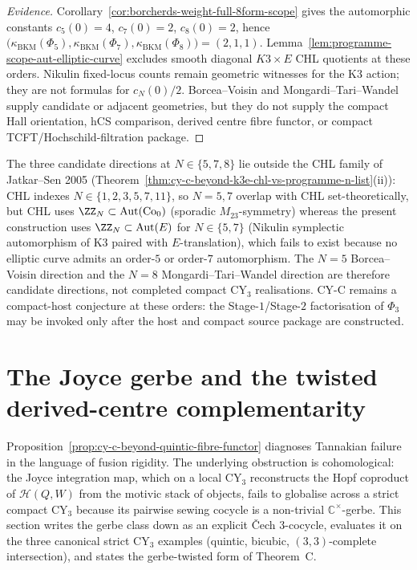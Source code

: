 \begin{proof}[Evidence]
Corollary~\ref{cor:borcherds-weight-full-8form-scope} gives the
automorphic constants \(c_5(0)=4\), \(c_7(0)=2\), \(c_8(0)=2\), hence
\(\bigl(\kappa_{\mathrm{BKM}}(\Phi_5),\kappa_{\mathrm{BKM}}(\Phi_7),\kappa_{\mathrm{BKM}}(\Phi_8)\bigr)=(2,1,1)\). Lemma~\ref{lem:programme-scope-aut-elliptic-curve}
excludes smooth diagonal \(K3\times E\) CHL quotients at these orders.
Nikulin fixed-locus counts remain geometric witnesses for the K3 action;
they are not formulas for \(c_N(0)/2\). Borcea--Voisin and
Mongardi--Tari--Wandel supply candidate or adjacent geometries, but they
do not supply the compact Hall orientation, hCS comparison, derived
centre fibre functor, or compact TCFT/Hochschild-filtration package.
\end{proof}

\begin{remark}
\label{rem:cy-c-beyond-non-chl-stratum-cy-c}
The three candidate directions at $N \in \{5, 7, 8\}$ lie outside the
CHL family of Jatkar--Sen 2005
(Theorem~\ref{thm:cy-c-beyond-k3e-chl-vs-programme-n-list}(ii)):
CHL indexes $N \in \{1, 2, 3, 5, 7, 11\}$, so $N = 5, 7$ overlap
with CHL set-theoretically, but CHL uses
$\ZZ_N \subset \mathrm{Aut}(\mathrm{Co}_0)$ (sporadic $M_{23}$-symmetry)
whereas the present construction uses
$\ZZ_N \subset \mathrm{Aut}(E)$ for $N \in \{5, 7\}$ (Nikulin
symplectic automorphism of K3 paired with $E$-translation), which
fails to exist because no elliptic curve admits an order-$5$ or
order-$7$ automorphism. The $N = 5$ Borcea--Voisin direction and the
$N = 8$ Mongardi--Tari--Wandel direction are therefore candidate
directions, not completed compact CY$_3$ realisations. CY-C remains a
compact-host conjecture at these orders: the Stage-$1$/Stage-$2$
factorisation of $\Phi_3$ may be invoked only after the host and
compact source package are constructed.
\end{remark}

\section{The Joyce gerbe and the twisted derived-centre complementarity}
\label{sec:cy-c-beyond-joyce-gerbe}

Proposition~\ref{prop:cy-c-beyond-quintic-fibre-functor} diagnoses Tannakian failure
in the language of fusion rigidity. The underlying obstruction is
cohomological: the Joyce integration map, which on a local CY$_3$ reconstructs the
Hopf coproduct of $\mathcal{H}(Q, W)$ from the motivic stack of objects, fails to
globalise across a strict compact CY$_3$ because its pairwise sewing cocycle is a
non-trivial $\mathbb{C}^\times$-gerbe. This section writes the gerbe class down
as an explicit \v{C}ech $3$-cocycle, evaluates it on the three canonical strict
CY$_3$ examples (quintic, bicubic, $(3,3)$-complete intersection), and states the
gerbe-twisted form of Theorem~C.

